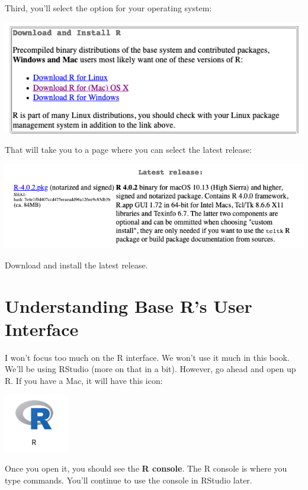 \documentclass[
]{book}
\begin{document}
Third, you'll select the option for your operating system:

\begin{center}\includegraphics[width=0.65\linewidth]{1.3_Download_and_Install} \end{center}

That will take you to a page where you can select the latest release:

\begin{center}\includegraphics[width=0.75\linewidth]{1.4_Download} \end{center}

Download and install the latest release.

\hypertarget{understanding-base-rs-user-interface}{%
\section{Understanding Base R's User Interface}\label{understanding-base-rs-user-interface}}

I won't focus too much on the R interface. We won't use it much in this book. We'll be using RStudio (more on that in a bit). However, go ahead and open up R. If you have a Mac, it will have this icon:

\begin{center}\includegraphics[width=0.1\linewidth]{1.5_R_Logo} \end{center}

Once you open it, you should see the \textbf{R console}. The R console is where you type commands. You'll continue to use the console in RStudio later.
\end{document}
